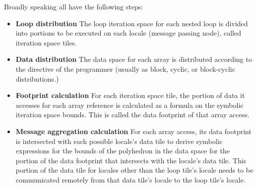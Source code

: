 Broadly speaking all have the following steps:

\begin{itemize}

\item {\bf Loop distribution} The loop iteration space for each nested loop is divided into portions to be executed on each locale (message passing node), called iteration space tiles. 

\item {\bf Data distribution} The data space for each array is distributed according to the directive of the programmer (usually as block, cyclic, or block-cyclic distributions.)

\item {\bf Footprint calculation} For each iteration space tile, the portion of data it accesses for each array reference is calculated as a formula on the symbolic iteration space bounds. This is called the data footprint of that array access.

\item {\bf Message aggregation calculation} For each array access, its data footprint is intersected with each possible locale's data tile to derive symbolic expressions for the bounds of the polyhedron in the data space for the portion of the data footprint that intersects with the locale's data tile. This portion of the data tile for locales other than the loop tile's locale needs to be communicated remotely from that data tile's locale to the loop tile's locale.

\end{itemize}

